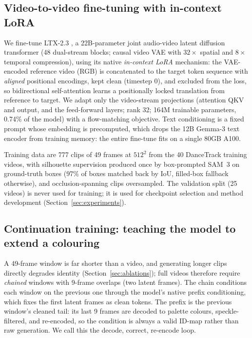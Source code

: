 \documentclass{article} %
\begin{document}
\subsection{Video-to-video fine-tuning with in-context LoRA}
\label{sec:iclora}

We fine-tune LTX-2.3 \citep{hacohen2026ltx2}, a 22B-parameter joint audio-video latent
diffusion transformer (48 dual-stream blocks; causal video VAE with $32\times$ spatial and
$8\times$ temporal compression), using its native \emph{in-context LoRA} mechanism: the
VAE-encoded reference video (RGB) is concatenated to the target token sequence with
\emph{aligned} positional encodings, kept clean (timestep 0), and excluded from the loss, so
bidirectional self-attention learns a positionally locked translation from reference to
target. We adapt only the video-stream projections (attention QKV and output, and the
feed-forward layers; rank 32; 164M trainable parameters, 0.74\% of the model) with a
flow-matching objective. Text conditioning is a fixed prompt whose embedding is
precomputed, which drops the 12B Gemma-3 text encoder from training memory: the entire
fine-tune fits on a single 80GB A100.

Training data are 777 clips of 49 frames at $512^2$ from the 40 DanceTrack training videos,
with silhouette supervision produced once by box-prompted SAM~3 \citep{carion2026sam3} on
ground-truth boxes (97\% of boxes matched back by IoU, filled-box fallback otherwise), and
occlusion-spanning clips oversampled. The validation split (25 videos) is never used for
training; it is used for checkpoint selection and method development
(Section~\ref{sec:experiments}).

\subsection{Continuation training: teaching the model to extend a colouring}
\label{sec:continuation}

A 49-frame window is far shorter than a video, and generating longer clips directly
degrades identity (Section~\ref{sec:ablations}); full videos therefore require
\emph{chained} windows with 9-frame overlaps (two latent frames). The chain conditions each
window on the previous one through the model's native prefix conditioning, which fixes the
first latent frames as clean tokens. The prefix is the previous window's cleaned tail: its
last 9 frames are decoded to palette colours, speckle-filtered, and re-encoded, so the
condition is always a valid ID-map rather than raw generation. We call this the decode,
correct, re-encode loop.
\end{document}
